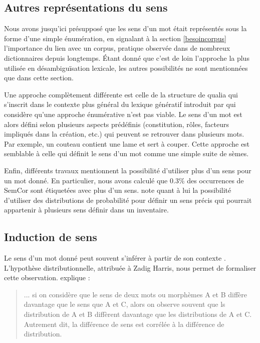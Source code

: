 \subsection{Autres représentations du sens}
\label{sensfunky}

Nous avons jusqu'ici présupposé que les sens d'un mot était représentés sous la
forme d'une simple énumération, en signalant à la section \ref{besoincorpus}
l'importance du lien avec un corpus, pratique observée dans de nombreux
dictionnaires depuis longtemps. Étant donné que c'est de loin l'approche la
plus utilisée en désambiguïsation lexicale, les autres possibilités ne sont
mentionnées que dans cette section.

Une approche complètement différente est celle de la structure de qualia
\citep{johnston1996qualia} qui s'inscrit dans le contexte plus général du
lexique génératif introduit par \cite{pustejovsky1991generative} qui considère
qu'une approche énumérative n'est pas viable. Le sens d'un mot est alors défini
selon plusieurs aspects prédéfinis (constitution, rôles, facteurs impliqués
dans la création, etc.) qui peuvent se retrouver dans plusieurs mots. Par
exemple, un couteau contient une lame et sert à couper. Cette approche est
semblable à celle qui définit le sens d'un mot comme une simple suite de sèmes.

Enfin, différents travaux mentionnent la possibilité d'utiliser plus d'un sens
pour un mot donné. En particulier, nous avons calculé que 0.3\% des occurrences
de SemCor sont étiquetées avec plus d'un sens. \cite{smith2011rumble} note
quant à lui la possibilité d'utiliser des distributions de probabilité pour
définir un sens précis qui pourrait appartenir à plusieurs sens définir dans un
inventaire.

\subsection{Induction de sens}
\label{distrib}

Le sens d'un mot donné peut souvent s'inférer à partir de son contexte
\citep{pantel2002discovering}. L'hypothèse distributionnelle, attribuée à Zadig
Harris, nous permet de formaliser cette observation.
\cite[p.~786]{harris1954distributional} explique :

\begin{quote} ... si on considère que le sens de deux mots ou morphèmes A et B
    diffère davantage que le sens que A et C, alors on observe souvent que ls
    distribution de A et B diffèrent davantage que les distributions de A et C.
    Autrement dit, la différence de sens est corrélée à la différence de
    distribution.  \end{quote}

